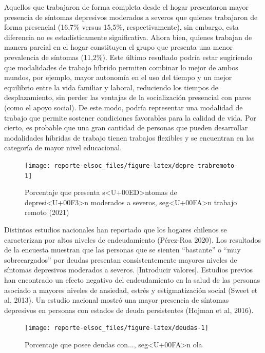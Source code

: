 \documentclass[
  12pt,
]{book}
\begin{document}
Aquellos que trabajaron de forma completa desde el hogar presentaron mayor presencia de síntomas depresivos moderados a severos que quienes trabajaron de forma presencial (16,7\% versus 15,5\%, respectivamente), sin embargo, esta diferencia no es estadísticamente significativa. Ahora bien, quienes trabajan de manera parcial en el hogar constituyen el grupo que presenta una menor prevalencia de síntomas (11,2\%). Este último resultado podría estar sugiriendo que modalidades de trabajo híbrido permiten combinar lo mejor de ambos mundos, por ejemplo, mayor autonomía en el uso del tiempo y un mejor equilibrio entre la vida familiar y laboral, reduciendo los tiempos de desplazamiento, sin perder las ventajas de la socialización presencial con pares (como el apoyo social). De este modo, podría representar una modalidad de trabajo que permite sostener condiciones favorables para la calidad de vida. Por cierto, es probable que una gran cantidad de personas que pueden desarrollar modalidades híbridas de trabajo tienen trabajos flexibles y se encuentran en las categoría de mayor nivel educacional.

\begin{figure}

{\centering \texttt{[image: reporte-elsoc\_files/figure-latex/depre-trabremoto-1]} 

}

\caption{Porcentaje que presenta s<U+00ED>ntomas de depresi<U+00F3>n moderados a severos, seg<U+00FA>n trabajo remoto (2021)}\label{fig:depre-trabremoto}
\end{figure}

Distintos estudios nacionales han reportado que los hogares chilenos se caracterizan por altos niveles de endeudamiento (Pérez-Roa 2020). Los resultados de la encuesta muestran que las personas que se sienten ``bastante'' o ``muy sobrecargados'' por deudas presentan consistentemente mayores niveles de síntomas depresivos moderados a severos. {[}Introducir valores{]}. Estudios previos han encontrado un efecto negativo del endeudamiento en la salud de las personas asociado a mayores niveles de ansiedad, estrés y estigmatización social (Sweet et al, 2013). Un estudio nacional mostró una mayor presencia de síntomas depresivos en personas con estados de deuda persistentes (Hojman et al, 2016).

\begin{figure}

{\centering \texttt{[image: reporte-elsoc\_files/figure-latex/deudas-1]} 

}

\caption{Porcentaje que posee deudas con..., seg<U+00FA>n ola}\label{fig:deudas}
\end{figure}
\end{document}
